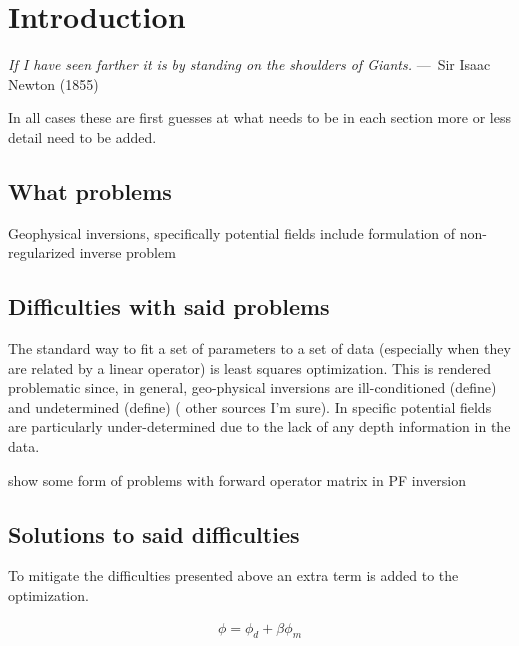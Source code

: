 
\chapter{Introduction}
\label{ch:Introduction}

\begin{epigraph}
    \emph{If I have seen farther it is by standing on the shoulders of
    Giants.} ---~Sir Isaac Newton (1855)
\end{epigraph}


In all cases these are first guesses at what needs to be in each section more or less detail need to be added.


\section{What problems}
\label{sec:What problems}

Geophysical inversions, specifically potential fields 
include formulation of non-regularized inverse problem

\section{Difficulties with said problems }
\label{sec:Difficulties with said problems }

The standard way to fit a set of parameters to a set of data (especially when they are related by a linear operator) is least squares optimization. This is rendered problematic since, in general, geo-physical inversions are ill-conditioned (define) and undetermined (define) (\cite{oldenburg2005inversion} other sources I'm sure). In specific potential fields are particularly under-determined due to the lack of any depth information in the data.

show some form of problems with forward operator matrix in PF inversion

\section{Solutions to said difficulties}
\label{sec:Solutions to said difficulties}

To mitigate the difficulties presented above an extra term is added to the optimization. 

\begin{align}
\phi = \phi_d + \beta\phi_m
\end{align}
\label{eq:objective function}


